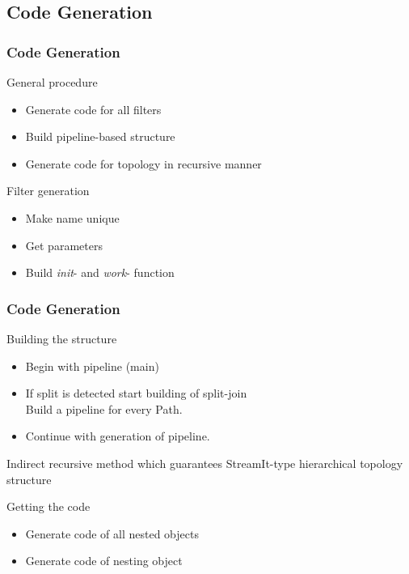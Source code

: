 \documentclass{beamer}
\begin{document}
\subsection{Code Generation}
\begin{frame}
\frametitle{Code Generation}
	\begin{block}{General procedure}
		\begin{itemize}
			\item Generate code for all filters
			\item Build pipeline-based structure
			\item Generate code for topology in recursive manner
		\end{itemize}
	\end{block}
	\begin{block}{Filter generation}
		\begin{itemize}
			\item Make name unique
			\item Get parameters
			\item Build \textit{init}- and \textit{work}- function
		\end{itemize}
	\end{block}
\end{frame}

\begin{frame}
\frametitle{Code Generation}
	\begin{block}{Building the structure}
		\begin{itemize}
			\item Begin with pipeline (main)
			\item If split is detected start building of split-join\\
				\quad Build a pipeline for every Path.
			\item Continue with generation of pipeline.
		\end{itemize}
		Indirect recursive method which guarantees StreamIt-type hierarchical topology structure
	\end{block}
	\begin{block}{Getting the code}
		\begin{itemize}
			\item Generate code of all nested objects
			\item Generate code of nesting object
		\end{itemize}
	\end{block}
\end{frame}
\end{document}
